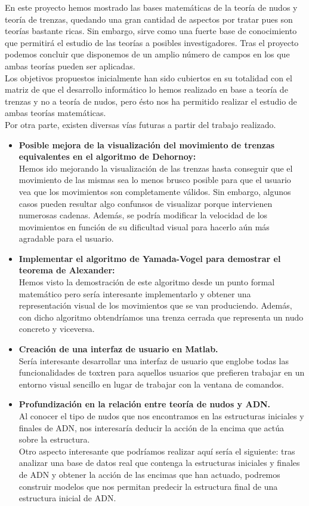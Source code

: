 
En este proyecto hemos mostrado las bases matemáticas de la teoría de nudos y teoría de trenzas, quedando una gran cantidad de aspectos por tratar pues son teorías bastante ricas. Sin embargo, sirve como una fuerte base de conocimiento que permitirá el estudio de las teorías a posibles investigadores. Tras el proyecto podemos concluir que disponemos de un amplio número de campos en los que ambas teorías pueden ser aplicadas. \\

Los objetivos propuestos inicialmente han sido cubiertos en su totalidad con el matriz de que el desarrollo informático lo hemos realizado en base a teoría de trenzas y no a teoría de nudos, pero ésto nos ha permitido realizar el estudio de ambas teorías matemáticas.\\

\bigskip
Por otra parte, existen diversas vías futuras a partir del trabajo realizado. 
\begin{itemize}
	\item\textbf{Posible mejora de la visualización del movimiento de trenzas equivalentes en el algoritmo de Dehornoy:}\\
	Hemos ido mejorando la visualización de las trenzas hasta conseguir que el movimiento de las mismas sea lo menos brusco posible para que el usuario vea que los movimientos son completamente válidos. Sin embargo, algunos casos pueden resultar algo confunsos de visualizar porque intervienen numerosas cadenas. Además, se podría modificar la velocidad de los movimientos en función de su dificultad visual para hacerlo aún más agradable para el usuario. 
	\item \textbf{Implementar el algoritmo de Yamada-Vogel para demostrar el teorema de Alexander:}\\
	Hemos visto la demostración de este algoritmo desde un punto formal matemático pero sería interesante implementarlo y obtener una representación visual de los movimientos que se van produciendo. Además, con dicho algoritmo obtendríamos una trenza cerrada que representa un nudo concreto y viceversa. 
	\item \textbf{Creación de una interfaz de usuario en Matlab. }\\
	Sería interesante desarrollar una interfaz de usuario que englobe todas las funcionalidades de toxtren para aquellos usuarios que prefieren trabajar en un entorno visual sencillo en lugar de trabajar con la ventana de comandos. 
	\newpage
	\item\textbf{Profundización en la relación entre teoría de nudos y ADN. }\\
	Al conocer el tipo de nudos que nos encontramos en las estructuras iniciales y finales de ADN, nos interesaría deducir la acción de la encima que actúa sobre la estructura. \\
	Otro aspecto interesante que podríamos realizar aquí sería el siguiente: tras analizar una base de datos real que contenga la estructuras iniciales y finales de ADN y obtener la acción de las encimas que han actuado, podremos construir modelos que nos permitan predecir la estructura final de una estructura inicial de ADN.
\end{itemize}